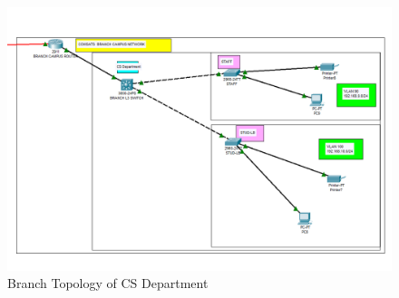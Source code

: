 \begin{figure}[H]  %
\begin{center}
\includegraphics[scale=0.50]{Chapter4/branchCSDepartment}
\caption{Branch Topology of CS Department}
\label{branchCSDepartment}
\end{center}
\end{figure}
